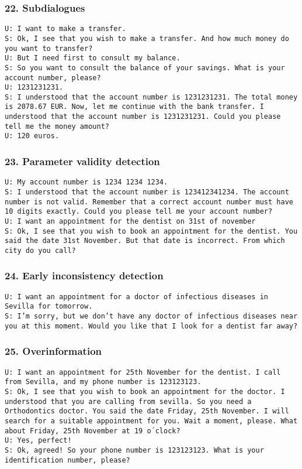\documentclass[11pt]{beamer}
\newcommand{\system}[1]{{\color{red}\texttt{S: #1}}\\}
\newcommand{\user}[1]{{\color{teal}\texttt{U: #1}}\\}
\begin{document}
\begin{frame}
\frametitle{22. Subdialogues}
\user{I want to make a transfer.}
\system{Ok, I see that you wish to make a transfer. And how much money do you want to transfer?}
\user{But I need first to consult my balance.}
\system{So you want to consult the balance of your savings. What is your account number, please?}
\user{1231231231.}
\system{I understood that the account number is 1231231231. The total money is 2078.67 EUR. Now, let me continue with the bank transfer. I understood that the account number is 1231231231. Could you please tell me the money amount?}
\user{120 euros.}
\end{frame}

\begin{frame}
\frametitle{23. Parameter validity detection}
\user{My account number is 1234 1234 1234.}
\system{I understood that the account number is 123412341234. The account number is not valid. Remember that a correct account number must have 10 digits exactly. Could you please tell me your account number?}
\vspace{10pt}
\user{I want an appointment for the dentist on 31st of november}
\system{Ok, I see that you wish to book an appointment for the dentist. You said the date 31st November. But that date is incorrect. From which city do you call?}
\end{frame}

\begin{frame}
\frametitle{24. Early inconsistency detection}
\user{I want an appointment for a doctor of infectious diseases in Sevilla for tomorrow.}
\system{I'm sorry, but we don't have any doctor of infectious diseases near you at this moment. Would you like that I look for a dentist far away?}
\end{frame}

\begin{frame}
\frametitle{25. Overinformation}
\user{I want an appointment for 25th November for the dentist. I call from Sevilla, and my phone number is 123123123.}
\system{Ok, I see that you wish to book an appointment for the doctor. I understood that you are calling from sevilla. So you need a Orthodontics doctor. You said the date Friday, 25th November. I will search for a suitable appointment for you. Wait a moment, please. What about Friday, 25th November at 19 o´clock?}
\user{Yes, perfect!}
\system{Ok, agreed! So your phone number is 123123123. What is your identification number, please?}
\end{frame}
\end{document}
